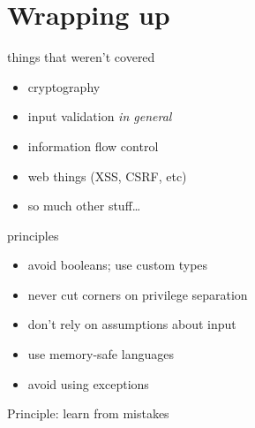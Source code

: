 \documentclass[ignorenonframetext,aspectratio=169,dvipsnames]{beamer}
\providecommand{\tightlist}{%
  \setlength{\itemsep}{0pt}\setlength{\parskip}{0pt}}
\begin{document}
\section{Wrapping up}\label{wrapping-up}

\begin{frame}{things that weren't covered}
\begin{itemize}
\tightlist
\item cryptography
\item input validation {\em in general}
\item information flow control
\item web things (XSS, CSRF, etc)
\item so much other stuff\ldots{}
\end{itemize}
\end{frame}

\begin{frame}{principles}
\begin{itemize}
\tightlist
\item avoid booleans; use custom types
\item never cut corners on privilege separation
\item don't rely on assumptions about input
\item use memory-safe languages
\item avoid using exceptions
\end{itemize}
\end{frame}

\begin{frame}[plain]
\huge
Principle: learn from mistakes
\end{frame}

\end{document}

